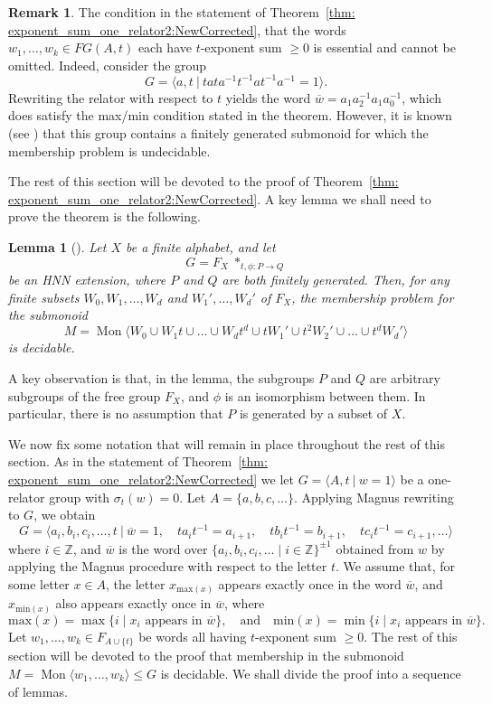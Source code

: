 \documentclass[11pt]{amsart}
\newcommand{\Mgen}[1]{\operatorname{Mon}\bigl\langle #1 \bigr\rangle}
\newcommand{\Gpres}[2]{\bigl\langle #1\:|\:#2 \bigr\rangle}
\theoremstyle{plain}
\newtheorem{lemma}[theorem]{Lemma}
\theoremstyle{definition}
\newtheorem{remark}[theorem]{Remark}
\begin{document}
\begin{remark}
The condition in the statement of Theorem~\ref{thm: exponent_sum_one_relator2:NewCorrected}, that the words $w_1, \ldots, w_k \in FG(A, t)$ each have $t$-exponent sum $\geq 0$ is essential and cannot be omitted. Indeed, consider the group
\[
G = \Gpres{a,t}{tata^{-1}t^{-1}at^{-1}a^{-1} = 1}.
\]
Rewriting the relator with respect to $t$ yields the word $\overline{w} = a_1a_2^{-1}a_1a_0^{-1}$, which does satisfy the max/min condition stated in the theorem. However, it is known (see \cite{gray2020undecidability}) that this group contains a finitely generated submonoid for which the membership problem is undecidable.
\end{remark}



The rest of this section will be devoted to the proof of 
Theorem~\ref{thm: exponent_sum_one_relator2:NewCorrected}.
A key lemma we shall need to prove the theorem is the following. 
 
\begin{lemma}[{\cite[Corollary 6.10]{dolinka2021new}}]\label{lem:DG}
Let $X$ be a finite alphabet, and let
\[
G = F_X \; \ast_{t, \phi: P \rightarrow Q}
\]
be an HNN extension, where $P$ and $Q$ are both finitely generated. Then, for any finite subsets $W_0, W_1, \ldots, W_d$ and $W_1', \ldots, W_d'$ of $F_X$, the membership problem for the submonoid
\[
M = \Mgen{W_0 \cup W_1t \cup \ldots \cup W_dt^d \cup tW_1' \cup t^2W_2' \cup \ldots \cup t^d W_d'}
\]
is decidable.
\end{lemma}

A key observation is that, in the lemma, the subgroups $P$ and $Q$ are arbitrary subgroups of the free group $F_X$, and $\phi$ is an isomorphism between them. In particular, there is no assumption that $P$ is generated by a subset of $X$.    


We now fix some notation that will remain in place throughout the rest of this section. As in the statement of Theorem~\ref{thm: exponent_sum_one_relator2:NewCorrected} we let $G = \Gpres{A, t}{w = 1}$ be a one-relator group with $\sigma_t(w) = 0$. Let $A = \{a, b, c, \ldots\}$. Applying Magnus rewriting to $G$, we obtain
\[
G = \Gpres{a_i, b_i, c_i, \ldots, t}{\overline{w} = 1, \quad
t a_i t^{-1} = a_{i+1}, \quad
t b_i t^{-1} = b_{i+1}, \quad
t c_i t^{-1} = c_{i+1}, \ldots}
\]
where $i \in \mathbb{Z}$, and $\overline{w}$ is the word over $\{a_i, b_i, c_i, \ldots \mid i \in \mathbb{Z} \}^{\pm 1}$ obtained from $w$ by applying the Magnus procedure with respect to the letter $t$. We assume that, for some letter $x \in A$, the letter $x_{\mathrm{max}(x)}$ appears exactly once in the word $\overline{w}$, and $x_{\mathrm{min}(x)}$ also appears exactly once in $\overline{w}$, where
\[
\mathrm{max}(x) = \max\{ i \mid x_i \text{ appears in } \overline{w} \}, 
\quad \text{and} \quad 
\mathrm{min}(x) = \min\{ i \mid x_i \text{ appears in } \overline{w} \}.
\]
Let $w_1, \ldots, w_k \in F_{A \cup \{ t \}}$ be words all having $t$-exponent sum $\geq 0$. The rest of this section will be devoted to the proof that membership in the submonoid $M = \Mgen{w_1, \ldots, w_k} \leqslant G$ is decidable. We shall divide the proof into a sequence of lemmas.
\end{document}
